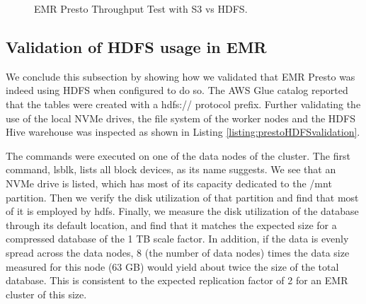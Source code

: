 \begin{figure}
   \begin{center}
   \end{center}
   \caption{EMR Presto Throughput Test with S3 vs HDFS.}
   \label{fig:additionalResultsPrestoHDFSvsS3TputTestTotalTime}
\end{figure}

\subsection{Validation of HDFS usage in EMR}

We conclude this subsection by showing how we validated that EMR Presto was indeed using HDFS when configured to do so. The AWS Glue catalog reported that the tables were created with a hdfs:// protocol prefix. Further validating the use of the local NVMe drives, the file system of the worker nodes and the HDFS Hive warehouse was inspected as shown in Listing \ref{listing:prestoHDFSvalidation}.

The commands were executed on one of the data nodes of the cluster. The first command, lsblk, lists all block devices, as its name suggests. We see that an NVMe drive is listed, which has most of its capacity dedicated to the /mnt partition. Then we verify the disk utilization of that partition and find that most of it is employed by hdfs. Finally, we measure the disk utilization of the database through its default location, and find that it matches the expected size for a compressed database of the 1 TB scale factor. In addition, if the data is evenly spread across the data nodes, 8 (the number of  data nodes) times the data size measured for this node (63 GB) would yield about twice the size of the total database. This is consistent to the expected replication factor of 2 for an EMR cluster of this size.

